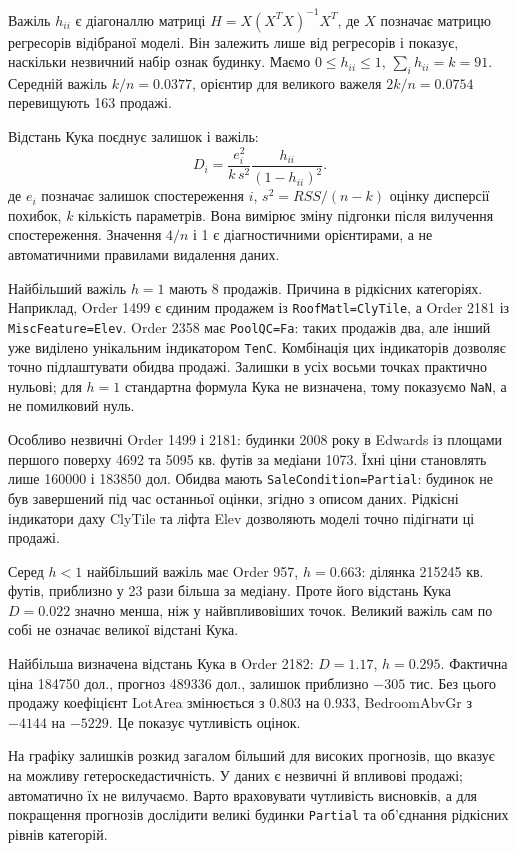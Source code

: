 \answerheading
Важіль \(h_{ii}\) є діагоналлю матриці \(H=X(X^TX)^{-1}X^T\), де \(X\)
позначає матрицю регресорів відібраної моделі. Він залежить лише від
регресорів і показує, наскільки незвичний набір ознак будинку. Маємо
\(0\le h_{ii}\le1\), \(\sum_i h_{ii}=k=91\). Середній важіль
\(k/n=0.0377\), орієнтир для великого важеля \(2k/n=0.0754\) перевищують
163 продажі.

Відстань Кука поєднує залишок і важіль:
\[D_i=\frac{e_i^2}{k\,s^2}\frac{h_{ii}}{(1-h_{ii})^2}.\] де \(e_i\)
позначає залишок спостереження \(i\), \(s^2=RSS/(n-k)\) оцінку дисперсії
похибок, \(k\) кількість параметрів. Вона вимірює зміну підгонки після
вилучення спостереження. Значення \(4/n\) і 1 є діагностичними
орієнтирами, а не автоматичними правилами видалення даних.

Найбільший важіль \(h=1\) мають 8 продажів. Причина в рідкісних
категоріях. Наприклад, Order 1499 є єдиним продажем із
\texttt{RoofMatl=ClyTile}, а Order 2181 із \texttt{MiscFeature=Elev}.
Order 2358 має \texttt{PoolQC=Fa}: таких продажів два, але інший уже
виділено унікальним індикатором \texttt{TenC}. Комбінація цих
індикаторів дозволяє точно підлаштувати обидва продажі. Залишки в усіх
восьми точках практично нульові; для \(h=1\) стандартна формула Кука не
визначена, тому показуємо \texttt{NaN}, а не помилковий нуль.

Особливо незвичні Order 1499 і 2181: будинки 2008 року в Edwards із
площами першого поверху 4692 та 5095 кв. футів за медіани 1073. Їхні
ціни становлять лише 160000 і 183850 дол. Обидва мають
\texttt{SaleCondition=Partial}: будинок не був завершений під час
останньої оцінки, згідно з описом даних. Рідкісні індикатори даху
ClyTile та ліфта Elev дозволяють моделі точно підігнати ці продажі.

Серед \(h<1\) найбільший важіль має Order 957, \(h=0.663\): ділянка
215245 кв. футів, приблизно у 23 рази більша за медіану. Проте його
відстань Кука \(D=0.022\) значно менша, ніж у найвпливовіших точок.
Великий важіль сам по собі не означає великої відстані Кука.

Найбільша визначена відстань Кука в Order 2182: \(D=1.17\), \(h=0.295\).
Фактична ціна 184750 дол., прогноз 489336 дол., залишок приблизно
\(-305\) тис. Без цього продажу коефіцієнт LotArea змінюється з 0.803 на
0.933, BedroomAbvGr з \(-4144\) на \(-5229\). Це показує чутливість
оцінок.

На графіку залишків розкид загалом більший для високих прогнозів, що
вказує на можливу гетероскедастичність. У даних є незвичні й впливові
продажі; автоматично їх не вилучаємо. Варто враховувати чутливість
висновків, а для покращення прогнозів дослідити великі будинки
\texttt{Partial} та об'єднання рідкісних рівнів категорій.


